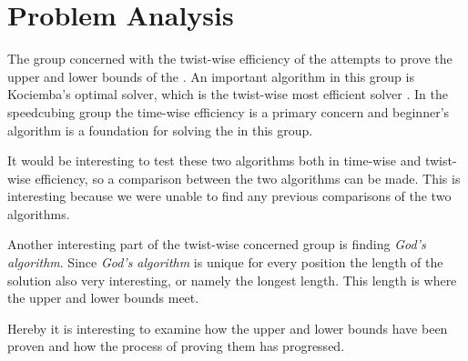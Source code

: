 \section{Problem Analysis}
The group concerned  with the twist-wise efficiency of the \rubik{} attempts to prove the upper and lower bounds of the \cube{}. 
An important algorithm in this group is Kociemba's optimal solver, which is the twist-wise  most efficient solver \cite{rokicki09}. 
In the speedcubing group the time-wise efficiency is a primary concern and beginner's algorithm is a foundation for solving the \cube{} in this group. 

It would be interesting to test these two algorithms both in time-wise and twist-wise efficiency, so a comparison between the two algorithms can be made. 
This is interesting because we were unable to find any previous comparisons of the two algorithms. 

Another interesting part of the twist-wise concerned group is finding \textit{God's algorithm}.
Since \textit{God's algorithm} is unique for every position the length of the solution also very interesting, or namely the longest length. 
This length is where the upper and lower bounds meet. 

Hereby it is interesting to examine how the upper and lower bounds have been proven and how the process of proving them has progressed.
